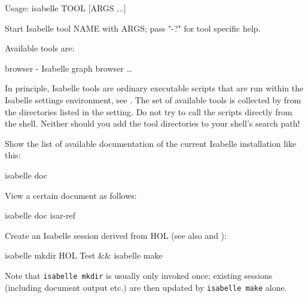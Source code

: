 \begin{isabellebody}
\begin{isamarkuptext}
\begin{ttbox}
Usage: isabelle TOOL [ARGS ...]

  Start Isabelle tool NAME with ARGS; pass "-?" for tool specific help.

  Available tools are:

    browser - Isabelle graph browser
    \dots
\end{ttbox}

  In principle, Isabelle tools are ordinary executable scripts that
  are run within the Isabelle settings environment, see
  .  The set of available tools is collected by
  \hyperlink{executable.isabelle}{\mbox{}} from the directories listed in the \hyperlink{setting.ISABELLE-TOOLS}{\mbox{}} setting.  Do not try to call the scripts directly
  from the shell.  Neither should you add the tool directories to your
  shell's search path!%
\end{isamarkuptext}%
\isamarkuptrue%
%
\isamarkuptrue%
%
\begin{isamarkuptext}%
Show the list of available documentation of the current Isabelle
  installation like this:

\begin{ttbox}
  isabelle doc
\end{ttbox}

  View a certain document as follows:
\begin{ttbox}
  isabelle doc isar-ref
\end{ttbox}

  Create an Isabelle session derived from HOL (see also
   and ):
\begin{ttbox}
  isabelle mkdir HOL Test && isabelle make
\end{ttbox}
  Note that \verb|isabelle mkdir| is usually only invoked once;
  existing sessions (including document output etc.) are then updated
  by \verb|isabelle make| alone.%
\end{isamarkuptext}%
\isamarkuptrue%
%
\isadelimtheory
%
\endisadelimtheory
%
\isatagtheory
{}\isamarkupfalse%
%
\endisatagtheory
{\isafoldtheory}%
%
\isadelimtheory
%
\endisadelimtheory
\end{isabellebody}%
